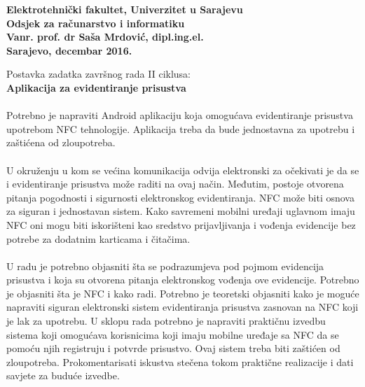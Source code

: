 \pagebreak
\thispagestyle{plain}
\begin{flushleft}
\textbf{Elektrotehnički fakultet, Univerzitet u Sarajevu}\\
\textbf{Odsjek za računarstvo i informatiku}\\
\textbf{Vanr. prof. dr Saša Mrdović, dipl.ing.el.}\\

\textbf{Sarajevo, decembar 2016.}\\
\end{flushleft}

\begin{center}
\vspace{0.5cm}
{\Large Postavka zadatka završnog rada II ciklusa:}\\
\vspace{0.2cm}
{\large \textbf{Aplikacija za evidentiranje prisustva}}
\end{center}

\paragraph*{}
Potrebno je napraviti Android aplikaciju koja omogućava evidentiranje prisustva upotrebom NFC tehnologije. Aplikacija treba da bude jednostavna za upotrebu i zaštićena od zloupotreba.

\paragraph*{}
U okruženju u kom se većina komunikacija odvija elektronski za očekivati je da se i evidentiranje prisustva može raditi na ovaj način. Međutim, postoje otvorena pitanja pogodnosti i sigurnosti elektronskog evidentiranja. NFC može biti osnova za siguran i jednostavan sistem. Kako savremeni mobilni uređaji uglavnom imaju NFC oni mogu biti iskorišteni kao sredstvo prijavljivanja i vođenja evidencije bez potrebe za dodatnim karticama i čitačima.

\paragraph*{}
U radu je potrebno objasniti šta se podrazumjeva pod pojmom evidencija prisustva i koja su otvorena pitanja elektronskog vođenja ove evidencije. Potrebno je objasniti šta je NFC i kako radi. Potrebno je teoretski objasniti kako je moguće napraviti siguran elektronski sistem evidentiranja prisustva zasnovan na NFC koji je lak za upotrebu. U sklopu rada potrebno je napraviti praktičnu izvedbu sistema koji omogućava korisnicima koji imaju mobilne uređaje sa NFC da se pomoću njih registruju i potvrde prisustvo. Ovaj sistem treba biti zaštićen od zloupotreba. Prokomentarisati iskustva stečena tokom praktične realizacije i dati savjete za buduće izvedbe.

